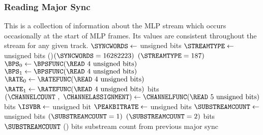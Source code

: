 \subsubsection{Reading Major Sync}
\label{mlp:readmajorsync}
This is a collection of information about the MLP stream
which occurs occasionally at the start of MLP frames.
Its values are consistent throughout the stream for any given track.
{
$\SYNCWORDS \leftarrow$  unsigned bits\;
$\STREAMTYPE \leftarrow$  unsigned bits\;
\eIf(){$(\SYNCWORDS = 16282223)$ \AND $(\STREAMTYPE = 187)$}{
  $\text{\BPS}_0 \leftarrow \BPSFUNC(\text{\READ 4 unsigned bits})$\;
  $\text{\BPS}_1 \leftarrow \BPSFUNC(\text{\READ 4 unsigned bits})$\;
  $\text{\RATE}_0 \leftarrow \RATEFUNC(\text{\READ 4 unsigned bits})$\;
  $\text{\RATE}_1 \leftarrow \RATEFUNC(\text{\READ 4 unsigned bits})$\;
   bits\;
  $(\text{\CHANNELCOUNT}~,~\text{\CHANNELASSIGNMENT}) \leftarrow \CHANNELFUNC(\text{\READ 5 unsigned bits})$\;
   bits\;
  $\text{\ISVBR} \leftarrow$  unsigned bit\;
  $\text{\PEAKBITRATE} \leftarrow$  unsigned bits\;
  $\text{\SUBSTREAMCOUNT} \leftarrow$  unsigned bits\;
  \ASSERT $(\text{\SUBSTREAMCOUNT} = 1)$ \OR $(\text{\SUBSTREAMCOUNT} = 2)$\;
   bits\;
  \Return $\text{\SUBSTREAMCOUNT}$\;
}(){
   bits\;
  \Return substream count from previous major sync\;
}
\EALGORITHM
}
